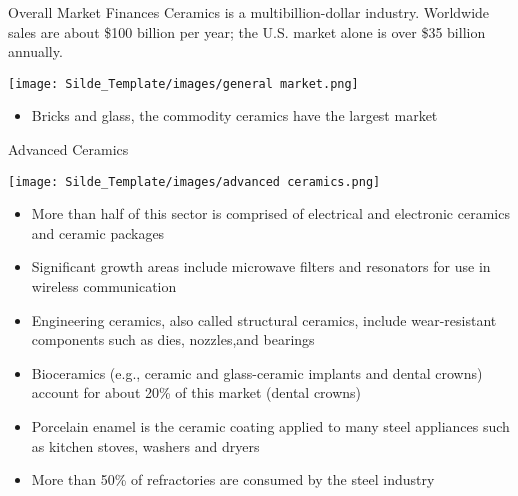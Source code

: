 \documentclass{libs/XJTLU_format}
\begin{document}
\begin{frame}{Overall Market Finances}
Ceramics is a multibillion-dollar industry. Worldwide sales are about \$100 billion per year; the U.S. market alone is over \$35 billion annually.
\vspace{1em}

\centering
\texttt{[image: Silde\_Template/images/general market.png]}
\vspace{1em}

\begin{itemize}
    \item Bricks and glass, the commodity ceramics have the largest market
\end{itemize}
    
\end{frame}

\begin{frame}{Advanced Ceramics}
\vspace{1em}

\centering
\texttt{[image: Silde\_Template/images/advanced ceramics.png]}

\begin{itemize}
    \small
    \item More than half of this sector is comprised of electrical and electronic ceramics and ceramic packages \pause
    \item Significant growth areas include microwave filters and resonators for use in wireless communication \pause
    \item Engineering ceramics, also called structural ceramics, include wear-resistant components such as dies, nozzles,and bearings\pause
    \item Bioceramics (e.g., ceramic and glass-ceramic implants and dental crowns) account for about 20\% of this market (dental crowns) \pause 
    \item Porcelain enamel is the ceramic coating applied to many steel appliances such as kitchen stoves, washers and dryers \pause
    \item More than 50\% of refractories are consumed by the steel industry \pause
\end{itemize}
\end{frame}
\end{document}
